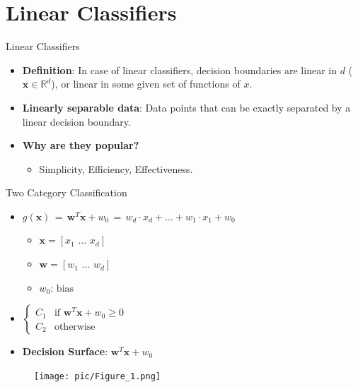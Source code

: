 \documentclass[serif, aspectratio=169]{beamer}
\begin{document}
\section{Linear Classifiers}

\begin{frame}{Linear Classifiers}
    \begin{itemize}\itemsep1.5em
        \item \justifying \textbf{Definition}: In case of linear classifiers, decision boundaries are linear in $d$ (\(\mathbf{x} \in \mathbb{R}^d\)), or linear in some given set of functions of $x$.
        \item \justifying \textbf{Linearly separable data}: Data points that can be exactly separated by a linear decision boundary.
        \item \textbf{Why are they popular?}
        \smallskip
        \begin{itemize}
            \item \justifying Simplicity, Efficiency, Effectiveness.
        \end{itemize}
    \end{itemize}
\end{frame}

\begin{frame}{Two Category Classification}
    \begin{itemize}\itemsep1.5em
        \item \(g(\mathbf{x}) \, = \, \mathbf{w}^T\mathbf{x} + w_0 \, = \, w_d \cdot x_d + ... + w_1 \cdot x_1 + w_0\)
        \begin{itemize}
            \item \(\mathbf{x} = [x_1 \, \, ... \, \, x_d]\)
            \item \(\mathbf{w} = [w_1 \, \, ... \, \, w_d]\)
            \item \(w_0 \text{: bias}\)
        \end{itemize}
        \item \(
            \begin{cases} 
                C_1 & \text{if } \mathbf{w}^T\mathbf{x} + w_0 \geq 0 \\
                C_2 & \text{otherwise}
            \end{cases}
            \)
        \item \justifying \textbf{Decision Surface}: \(\mathbf{w}^T\mathbf{x} + w_0\)
    \end{itemize}
    \endminipage
    \hfill
        \begin{figure}[bh]
            \texttt{[image: pic/Figure\_1.png]}
        \end{figure}
    \endminipage
\end{frame}
\end{document}
